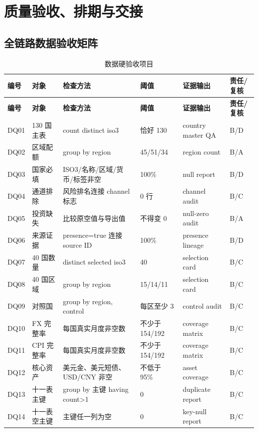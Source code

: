 \documentclass[UTF8,fontset=windows,12pt,openany]{ctexbook}
\begin{document}
\part{质量验收、排期与交接}

\chapter{全链路数据验收矩阵}
\clearpage
\begin{landscape}
\begin{longtable}{p{1.7cm}p{4.0cm}p{4.6cm}p{3.0cm}p{3.2cm}p{2.7cm}}
\caption{数据硬验收项目}\label{tab:data-acceptance}\\
\toprule
\textbf{编号} & \textbf{对象} & \textbf{检查方法} & \textbf{阈值} & \textbf{证据输出} & \textbf{责任/复核}\\
\midrule
\endfirsthead
\toprule \textbf{编号} & \textbf{对象} & \textbf{检查方法} & \textbf{阈值} & \textbf{证据输出} & \textbf{责任/复核}\\ \midrule
\endhead
DQ01 & 130 国主表 & count distinct iso3 & 恰好 130 & country master QA & B/D\\
DQ02 & 区域配额 & group by region & 45/51/34 & region count & B/A\\
DQ03 & 国家必填 & ISO3/名称/区域/货币/标签非空 & 100\% & null report & B/D\\
DQ04 & 通道排除 & 风险排名连接 channel 标志 & 0 行 & channel audit & B/C\\
DQ05 & 投资缺失 & 比较原空值与导出值 & 不得变 0 & null-zero audit & B/A\\
DQ06 & 来源证据 & presence=true 连接 source ID & 100\% & presence lineage & B/D\\
DQ07 & 40 国数量 & distinct selected iso3 & 40 & selection card & B/C\\
DQ08 & 40 国区域 & group by region & 15/14/11 & selection card & B/C\\
DQ09 & 对照国 & group by region, control & 每区至少 3 & control audit & B/C\\
DQ10 & FX 完整率 & 每国真实月度非空数 & 不少于 154/192 & coverage matrix & B/C\\
DQ11 & CPI 完整率 & 每国真实月度非空数 & 不少于 154/192 & coverage matrix & B/C\\
DQ12 & 核心资产 & 美元金、美元短债、USD/CNY 非空 & 不低于 95\% & asset coverage & B/C\\
DQ13 & 十一表主键 & group by 主键 having count>1 & 0 & duplicate report & B/C\\
DQ14 & 十一表空主键 & 主键任一列为空 & 0 & key-null report & B/C\\

\end{longtable}
\end{landscape}
\end{document}
